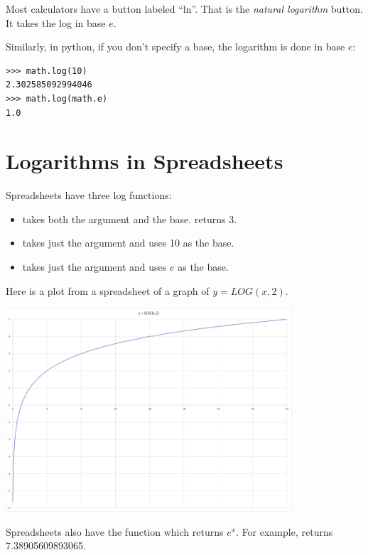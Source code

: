 Most calculators have a button labeled ``ln''.  That is the
\textit{natural logarithm} button. It takes the log in base $e$.

Similarly, in python, if you don't specify a base, the logarithm is done in base $e$:

\begin{Verbatim}
>>> math.log(10)
2.302585092994046
>>> math.log(math.e)
1.0
\end{Verbatim}

\section{Logarithms in Spreadsheets}

Spreadsheets have three log functions:
\begin{itemize}
\item {} takes both the argument and the base.  returns 3.
\item {} takes just the argument and uses 10 as the base.
\item {} takes just the argument and uses $e$ as the base.
\end{itemize}

Here is a plot from a spreadsheet of a graph of $y = LOG(x, 2)$.

\includegraphics[width=0.8\textwidth]{log_graph.png}

Spreadsheets also have the function  which returns
$e^x$.  For example,  returns 7.38905609893065.


